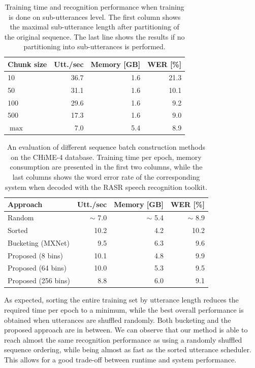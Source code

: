 \documentclass{article}
\begin{document}
	\begin{table}[tbp]
		\centering
		\caption{Training time and recognition performance when training is done 
		on sub-utterances level. The first column shows the maximal sub-utterance length 
		after partitioning of the original sequence. The last line shows the results 
		if no partitioning into sub-utterances is performed. }
		\label{tab:chime:chunk}
		\begin{tabular}{lrrr}
			\hline
			Chunk size              & Utt./sec & Memory [GB] & WER [\%] \\
			\hline
			10     					&	36.7   & 1.6         &	21.3     \\
			50  					&	31.1   & 1.6		 &  10.1     \\
			100 					& 	29.6   & 1.6		 &	9.2      \\
			500						& 	17.3   & 1.6         &	9.0      \\
			$\max$					&	7.0	   & 5.4         &	8.9      \\
			\hline
		\end{tabular}
	\end{table}

	\begin{table}[tbp]
		\centering
		\caption{An evaluation of different sequence batch construction methods on the CHiME-4 database. Training time per epoch, memory consumption are presented in the first two columns, while the last columns shows the word error rate of the corresponding system
		when decoded with the RASR speech recognition toolkit.}
		\label{tab:chime:batch}
		\begin{tabular}{lrrr}
			\hline
			Approach                & Utt./sec & Memory [GB] & WER [\%]          \\
			\hline
			Random 					& $\sim$ 7.0     & $\sim$ 5.4		 & $\sim$ 8.9		 \\
			Sorted					& 10.2    &	4.2 & 10.2		 \\
			\hline
			Bucketing (MXNet)		& 9.5     &	6.3		 & 9.6		 \\
			Proposed (8 bins)	    & 10.1	   & 4.8     & 9.9		 \\
			Proposed (64 bins)	    & 10.0     & 5.3     & 9.5		 \\
			Proposed (256 bins)	    & 8.8	   & 6.0     & 9.1		 \\
			\hline
		\end{tabular}
	\end{table}

  As expected, sorting the entire training set by utterance length reduces the required time 
  per epoch to a minimum, while the best overall performance is obtained when utterances are shuffled randomly. Both bucketing and the proposed 
  approach are in between. We can observe that our method is able to reach almost the same recognition performance as using a randomly shuffled sequence
  ordering, while being almost as fast as the sorted utterance scheduler. This allows for a good trade-off between runtime and system performance.
  
\end{document}
